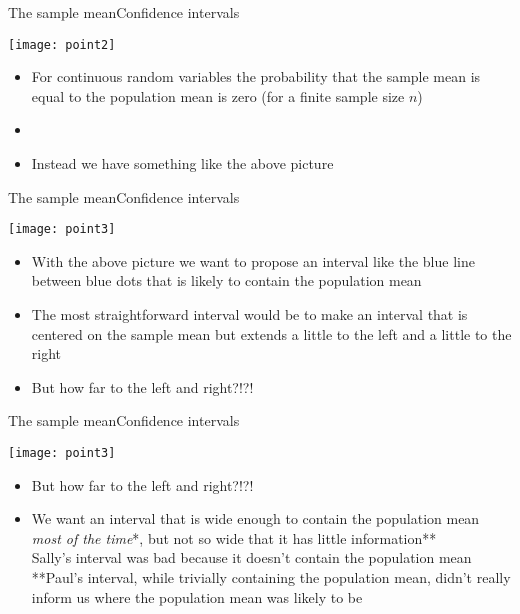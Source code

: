 \documentclass[xcolor=dvipsnames]{beamer}
\begin{document}
\begin{frame}{The sample mean}{Confidence intervals}
	\begin{center}
		\texttt{[image: point2]}
	\end{center}
	\begin{itemize}
		\item For continuous random variables the probability that the sample mean is equal to the population mean is zero (for a finite sample size $n$)
		\item[]
		\item Instead we have something like the above picture
	\end{itemize}
\end{frame}

\begin{frame}{The sample mean}{Confidence intervals}
	\begin{center}
		\texttt{[image: point3]}
	\end{center}
	\begin{itemize}
		\item With the above picture we want to propose an interval like the blue line between blue dots that is likely to contain the population mean
		\item The most straightforward interval would be to make an interval that is centered on the sample mean but extends a little to the left and a little to the right
		\item But how far to the left and right?!?!
	\end{itemize}
\end{frame}

\begin{frame}{The sample mean}{Confidence intervals}
	\begin{center}
		\texttt{[image: point3]}
	\end{center}
	\begin{itemize}
		\item But how far to the left and right?!?!
		\item We want an interval that is wide enough to contain the population mean \emph{most of the time}*, but not so wide that it has little information** \\
		\vspace{2.5pt}
		{\tiny *Sally's interval was bad because it doesn't contain the population mean
			**Paul's interval, while trivially containing the population mean, didn't really inform us where the population mean was likely to be}
	\end{itemize}
\end{frame}
\end{document}
